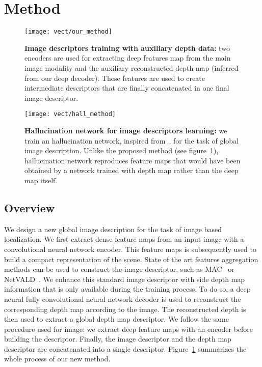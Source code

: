 \section{Method}
\label{sec:method}

\begin{figure}
	\center
	\texttt{[image: vect/our\_method]}
	\caption{\label{fig:our_method} \textbf{Image descriptors training with auxiliary depth data:} two encoders are used for extracting deep features map from the main image modality and the auxiliary reconstructed depth map (inferred from our deep decoder). These features are used to create intermediate descriptors that are finally concatenated in one final image descriptor.}
\end{figure}

\begin{figure}
	\center
	\texttt{[image: vect/hall\_method]}
	\caption{\label{fig:hall_method} \textbf{Hallucination network for image descriptors learning:} we train an hallucination network, inspired from~\cite{Hoffman2016}, for the task of global image description. Unlike the proposed method (see figure~\ref{fig:our_method}), hallucination network reproduces feature maps that would have been obtained by a network trained with depth map rather than the deep map itself.}
\end{figure}



\subsection{Overview}
\label{subsec:overview}
We design a new global image description for the task of image based localization. We first extract dense feature maps from an input image with a convolutional neural network encoder. This feature maps is subsequently used to build a compact representation of the scene. State of the art features aggregation methods can be used to construct the image descriptor, such as MAC~\cite{Radenovic2017} or NetVALD~\cite{Arandjelovic2017}. We enhance this standard image descriptor with side depth map information that is only available during the training process. To do so, a deep neural fully convolutional neural network decoder is used to reconstruct the corresponding depth map according to the image. The reconstructed depth is then used to extract a global depth map descriptor. We follow the same procedure used for image: we extract deep feature maps with an encoder before building the descriptor. Finally, the image descriptor and the depth map descriptor are concatenated into a single descriptor. Figure~\ref{fig:our_method} summarizes the whole process of our new method.

